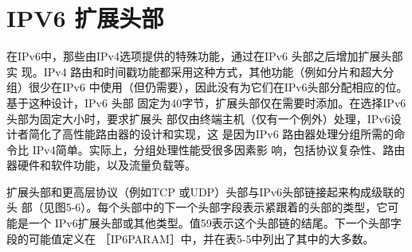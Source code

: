 \section{IPV6 扩展头部}

在IPv6中，那些由IPv4选项提供的特殊功能，通过在IPv6 头部之后增加扩展头部实
现。IPv4 路由和时间戳功能都采用这种方式，其他功能（例如分片和超大分组）很少在IPv6
中使用（但仍需要），因此没有为它们在IPv6头部分配相应的位。基于这种设计，IPv6 头部
固定为40字节，扩展头部仅在需要时添加。在选择IPv6头部为固定大小时，要求扩展头
部仅由终端主机（仅有一个例外）处理，IPv6设计者简化了高性能路由器的设计和实现，这
是因为IPv6 路由器处理分组所需的命令比 IPv4简单。实际上，分组处理性能受很多因素影
响，包括协议复杂性、路由器硬件和软件功能，以及流量负载等。

扩展头部和更高层协议（例如TCP 或UDP）头部与IPv6头部链接起来构成级联的头
部（见图5-6）。每个头部中的下一个头部字段表示紧跟着的头部的类型，它可能是一个
IPv6扩展头部或其他类型。值59表示这个头部链的结尾。下一个头部字段的可能值定义在
［IP6PARAM］中，并在表5-5中列出了其中的大多数。

